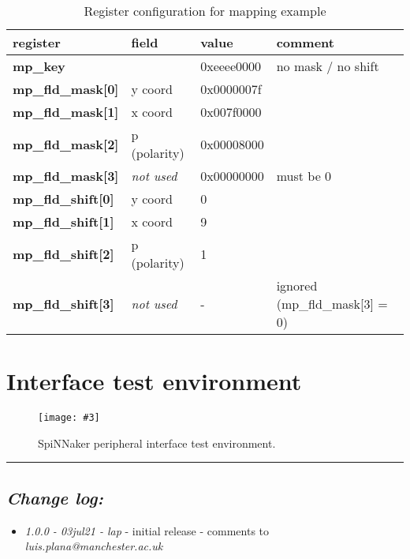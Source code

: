 \documentclass[11pt,a4paper,twoside]{article}
\newcommand{\image}[5][]
{
\begin{figure}[#2]
   \begin{center}
      \texttt{[image: \#3]}
      \caption{#5}
      \label{fig:#4}
   \end{center}
\end{figure}
}
\begin{document}
\begin{table}[!ht]
	\begin{center}
		\begin{tabular}{| l l l l |}
			\hline
			\textbf{register} & \textbf{field} & \textbf{value} & \textbf{comment}  \\%
			\hline
			\hline
			\textbf{mp\_key}           &                   & 0xeeee0000 & no mask / no shift  \\%
			\textbf{mp\_fld\_mask[0]}  & y coord           & 0x0000007f &                     \\%
			\textbf{mp\_fld\_mask[1]}  & x coord           & 0x007f0000 &                     \\%
			\textbf{mp\_fld\_mask[2]}  & p (polarity)      & 0x00008000 &                     \\%
			\textbf{mp\_fld\_mask[3]}  & \textit{not used} & 0x00000000 & must be 0           \\%
			\textbf{mp\_fld\_shift[0]} & y coord           & 0          &                     \\%
			\textbf{mp\_fld\_shift[1]} & x coord           & 9          &                     \\%
			\textbf{mp\_fld\_shift[2]} & p (polarity)      & 1          &                     \\%
			\textbf{mp\_fld\_shift[3]} & \textit{not used} & -          & ignored (mp\_fld\_mask[3] = 0) \\%
			\hline
		\end{tabular}
		\caption{Register configuration for mapping example}
	\end{center}
	\label{tab:map_regs}
\end{table}


\clearpage
\section{Interface test environment}


\image[width = 0.8 \textwidth]{!h}{spif_test_env}{fig:spif_test}
{SpiNNaker peripheral interface test environment.}


\vspace*{1.0cm}
\rule{\linewidth}{2pt}


\subsection*{\itshape Change log:}


\begin{itemize}
	\item {\itshape 1.0.0 - 03jul21 - lap} - initial release - comments to
	{\itshape luis.plana@manchester.ac.uk}
\end{itemize}
\end{document}
